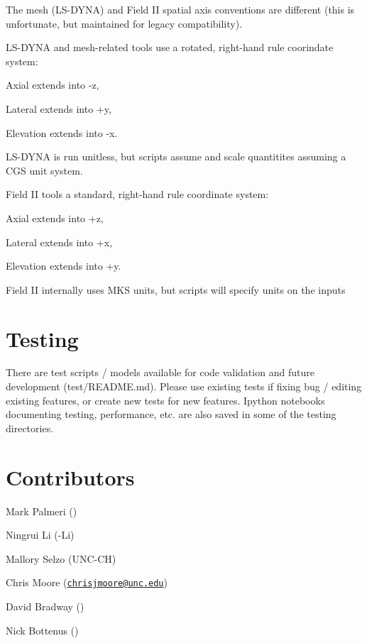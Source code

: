 \begin{DoxyItemize}
\item The mesh (L\+S-\/\+D\+Y\+N\+A) and Field I\+I spatial axis conventions are different (this is unfortunate, but maintained for legacy compatibility).
\item L\+S-\/\+D\+Y\+N\+A and mesh-\/related tools use a rotated, right-\/hand rule coorindate system\+:
\begin{DoxyItemize}
\item Axial extends into -\/z,
\item Lateral extends into +y,
\item Elevation extends into -\/x.
\end{DoxyItemize}
\item L\+S-\/\+D\+Y\+N\+A is run unitless, but scripts assume and scale quantitites assuming a C\+G\+S unit system.
\item Field I\+I tools a standard, right-\/hand rule coordinate system\+:
\begin{DoxyItemize}
\item Axial extends into +z,
\item Lateral extends into +x,
\item Elevation extends into +y.
\end{DoxyItemize}
\item Field I\+I internally uses M\+K\+S units, but scripts will specify units on the inputs
\end{DoxyItemize}

\section*{Testing }

There are test scripts / models available for code validation and future development (test/\+R\+E\+A\+D\+M\+E.md). Please use existing tests if fixing bug / editing existing features, or create new tests for new features. Ipython notebooks documenting testing, performance, etc. are also saved in some of the testing directories.

\section*{Contributors }


\begin{DoxyItemize}
\item Mark Palmeri ()
\item Ningrui Li (-\/\+Li)
\item Mallory Selzo (U\+N\+C-\/\+C\+H)
\item Chris Moore (\href{mailto:chrisjmoore@unc.edu}{\tt chrisjmoore@unc.\+edu})
\item David Bradway ()
\item Nick Bottenus () 
\end{DoxyItemize}